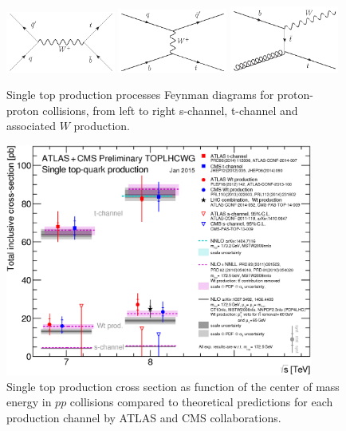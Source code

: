 \begin{figure}[!Hhtbp]
  \begin{center}
    \includegraphics[width=0.32\textwidth]{figs/Schannel_top_single.jpg}
    \includegraphics[width=0.32\textwidth]{figs/Tchannel_top_single.jpg}
    \includegraphics[width=0.32\textwidth]{figs/TWchannel_top_single.jpg}
    \caption{Single top production processes Feynman diagrams for proton-proton collisions, from left to right s-channel, t-channel and associated $W$ production.}
    \label{fig:SingleProductionFD}
  \end{center}
\end{figure}

\begin{figure}[!Hhtbp]
  \begin{center}
    \includegraphics[width=0.9\textwidth]{figs/singletop_allchanvsroots.png}
    \caption{Single top production cross section as function of the center of mass energy in $pp$ collisions compared to theoretical predictions for each production channel by ATLAS and CMS collaborations.}
    \label{fig:SingleProduction}
  \end{center}
\end{figure}

